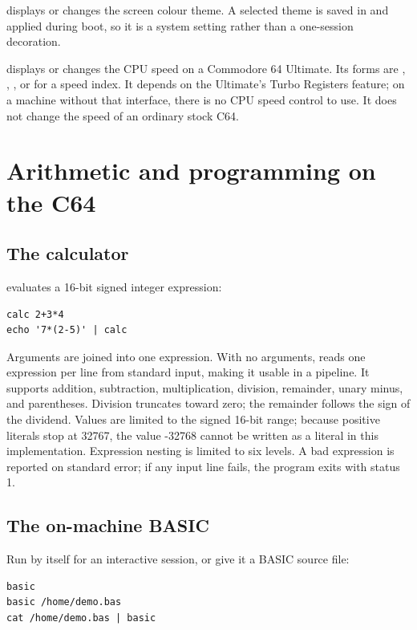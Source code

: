  displays or changes the screen colour theme. A selected theme is saved in  and applied during boot, so it is a system setting rather than a one-session decoration.

 displays or changes the CPU speed on a Commodore 64 Ultimate. Its forms are , , , or  for a speed index. It depends on the Ultimate's Turbo Registers feature; on a machine without that interface, there is no CPU speed control to use. It does not change the speed of an ordinary stock C64.

\section{Arithmetic and programming on the C64}

\subsection{The calculator}

 evaluates a 16-bit signed integer expression:

\begin{lstlisting}
calc 2+3*4
echo '7*(2-5)' | calc
\end{lstlisting}

Arguments are joined into one expression. With no arguments,  reads one expression per line from standard input, making it usable in a pipeline. It supports addition, subtraction, multiplication, division, remainder, unary minus, and parentheses. Division truncates toward zero; the remainder follows the sign of the dividend. Values are limited to the signed 16-bit range; because positive literals stop at 32767, the value -32768 cannot be written as a literal in this implementation. Expression nesting is limited to six levels. A bad expression is reported on standard error; if any input line fails, the program exits with status 1.

\subsection{The on-machine BASIC}

Run  by itself for an interactive session, or give it a BASIC source file:

\begin{lstlisting}
basic
basic /home/demo.bas
cat /home/demo.bas | basic
\end{lstlisting}

